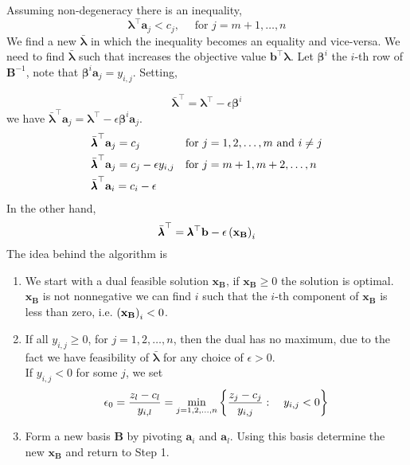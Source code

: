 Assuming non-degeneracy there is an inequality,
\begin{equation}
	\pmb{\lambda}^\top\mathbf{a}_j<c_j, \quad \text{ for } j=m+1,\dots, n
\end{equation}
We find a new $\bar{\pmb{\lambda}}$ in which the inequality becomes an equality and vice-versa. We need to find $\bar{\pmb{\lambda}}$ such that increases the objective value $\mathbf{b}^\top\pmb{\lambda}$.
Let $\pmb{\beta}^{i}$ the $i$-th row of $\mathbf{B}^{-1}$, note that $\pmb{\beta}^{i}\mathbf{a}_j=y_{i,j}$. Setting,

 \begin{equation}
 	\bar{\pmb{\lambda}}^\top=\pmb{\lambda}^\top -\epsilon\pmb{\beta}^i 
 \end{equation}
 we have  $\bar{\pmb{\lambda}}^\top\mathbf{a}_j=\pmb{\lambda}^\top -\epsilon\pmb{\beta}^i\mathbf{a}_j$. 
 \begin{align}
		&\bar{\pmb{\lambda}}^\top \mathbf{a}_j=c_j & &\text{for } j=1,2,\dots, m\ \mathrm{and}\ i\neq j\\
 	&\bar{\pmb{\lambda}}^\top \mathbf{a}_j=c_j-\epsilon y_{i, j}& &\text{for } j=m+1,m+2,\dots, n \\
 	&\bar{\pmb{\lambda}}^\top\mathbf{a}_i=c_i-\epsilon 
 \end{align}
 In the other hand,
 \begin{equation}
 	\bar{\pmb{\lambda}}^\top=\pmb{\lambda}^\top \mathbf{b}-\epsilon\left(  \mathbf{x}_{\mathbf{B}} \right)_i
 \end{equation}
 The idea behind the algorithm is 
\begin{enumerate}
	\item We start with a dual feasible solution $\mathbf{x}_{\mathbf{B}}$, if $\mathbf{x}_{\mathbf{B}}\geq 0$ the solution is optimal. $\mathbf{x}_{\mathbf{B}}$ is not nonnegative we can find $i$ such that the $i$-th component of $\mathbf{x}_{\mathbf{B}}$ is less than zero, i.e. $\left(  \mathbf{x}_{\mathbf{B}} \right)_i<0$.
	\item If all $y_{i,j}\geq 0$, for $j=1,2,\dots,n$, then the dual has no maximum, due to the fact we have feasibility of $\bar{\pmb\lambda}$ for any choice of $\epsilon>0$. 
	\\
	If $y_{i,j}<0$ for some $j$, we set
	\begin{equation*}
		\epsilon_0=\frac{z_l-c_l}{y_{i,l}}=\min_{j=1,2,\dots,n}\left\lbrace \frac{z_j-c_j}{y_{i,j}}:\quad y_{i,j}<0 \right\rbrace
	\end{equation*}
	\item Form a new basis $\mathbf{B}$ by pivoting $\mathbf{a}_i$ and $\mathbf{a}_l$. Using this basis determine the new $\mathbf{x}_{\mathbf{B}}$ and return to Step 1.
\end{enumerate}


